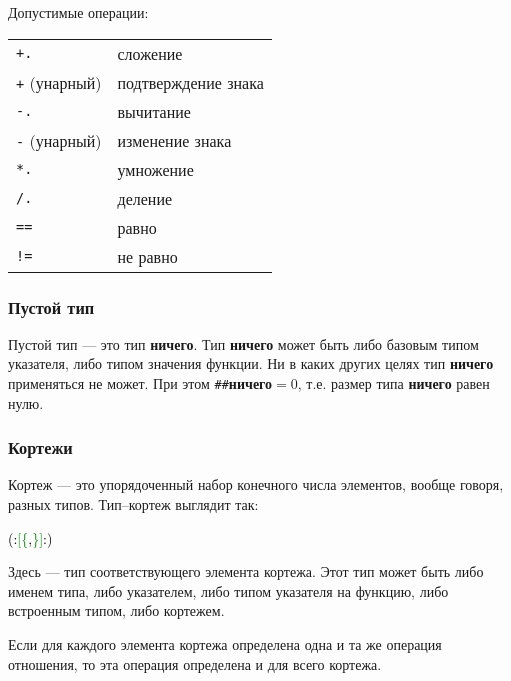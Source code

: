\documentclass[10pt]{report}
\begin{document}
Допустимые операции:
\begin{longtable}{ll}
\texttt{+.}             & сложение                                          \\
\texttt{+} (унарный)    & подтверждение знака                               \\
\texttt{-.}             & вычитание                                         \\
\texttt{-} (унарный)    & изменение знака                                   \\
\texttt{*.}             & умножение                                         \\
\texttt{/.}             & деление                                           \\
\texttt{==}             & равно                                             \\
\texttt{!=}             & не равно                                          \\
\end{longtable}
        

        \subsubsection{Пустой тип}
Пустой тип --- это тип \textbf{ничего}. Тип \textbf{ничего} может быть либо базовым типом указателя, либо типом значения функции. Ни в каких других целях тип \textbf{ничего} применяться не может. При этом \texttt{\#\#}\textbf{ничего}$=0$, т.е. размер типа \textbf{ничего} равен нулю.

        \subsubsection{Кортежи}
Кортеж --- это упорядоченный набор конечного числа элементов, вообще говоря, разных типов. Тип--кортеж выглядит так:
\begin{center}
\noindent\textcolor{Green}{\textcolor{Black}{(:}[\{\textcolor{Black}{,}\}]\textcolor{Black}{:)}}
\end{center}        
   
Здесь \textcolor{Green}{}  --- тип соответствующего элемента кортежа. Этот тип может быть либо именем типа, либо указателем, либо типом указателя на функцию, либо встроенным типом, либо кортежем.

Если для каждого элемента кортежа определена одна и та же операция отношения, то эта операция определена и для всего кортежа.
\end{document}
